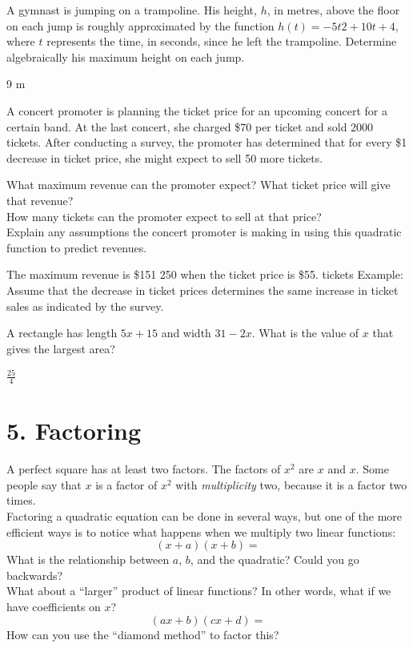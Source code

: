 \documentclass[12pt,fleqn]{book}
\newcommand{\prb}[1]{\begin{Exercise}#1\end{Exercise}}
\newcommand{\sol}[1]{\begin{Answer}#1\end{Answer}}
\begin{document}
\prb{A gymnast is jumping on a trampoline.
	His height, $h$, in metres, above the floor
	on each jump is roughly approximated
	by the function $h(t) = -5t2 + 10t + 4$,
	where $t$ represents the time, in seconds,
	since he left the trampoline. Determine
	algebraically his maximum height on
	each jump.\\[2in]}
\sol{9 m}

\prb{A concert promoter is planning the ticket
	price for an upcoming concert for a certain
	band. At the last concert, she charged
	\$70 per ticket and sold 2000 tickets. After
	conducting a survey, the promoter has
	determined that for every \$1 decrease
	in ticket price, she might expect to sell
	50 more tickets.
	\begin{tasks}
		\task What maximum revenue can the
		promoter expect? What ticket price
		will give that revenue?\\[1in]
		\task How many tickets can the promoter
		expect to sell at that price?\\[1in]
		\task Explain any assumptions the concert
		promoter is making in using this
		quadratic function to predict revenues.\\[1in]
	\end{tasks}
}
\sol{
	\begin{tasks}
		\task The maximum revenue is \$151 250 when the ticket price is \$55.
		\task 2750 tickets
		\task Example: Assume that the decrease in ticket prices determines the same increase in ticket sales as indicated by the survey.
	\end{tasks}
}

\prb{A rectangle has length $5x+15$ and width $31-2x$.  What is the value of $x$ that gives the largest area?}
\sol{$\frac{25}{4}$}










\chapter{5. Factoring}
A perfect square has at least two factors.  The factors of $x^2$ are $x$ and $x$.  Some people say that $x$ is a factor of $x^2$ with \emph{multiplicity} two, because it is a factor two times.
\\[1em]
Factoring a quadratic equation can be done in several ways, but one of the more efficient ways is to notice what happens when we multiply two linear functions:
\[
    (x+a)(x+b) =
\]
What is the relationship between $a$, $b$, and the quadratic?  Could you go backwards?
\\[1in]
What about a ``larger'' product of linear functions?  In other words, what if we have coefficients on $x$?
\[ 
    (ax+b)(cx+d) = 
\]
How can you use the ``diamond method'' to factor this?
\\[2in]
\end{document}
